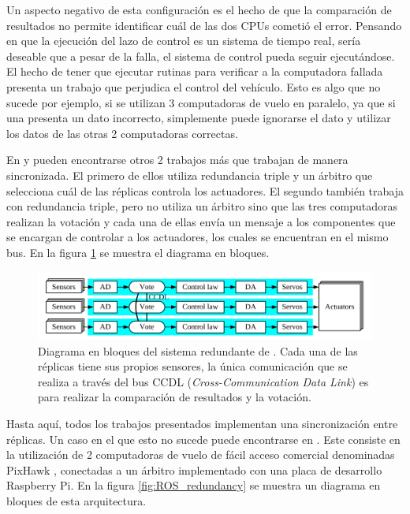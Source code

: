 Un aspecto negativo de esta configuración es el hecho de que la comparación de resultados no permite identificar cuál de las dos CPUs cometió el error. %
Pensando en que la ejecución del lazo de control es un sistema de tiempo real, sería deseable que a pesar de la falla, el sistema de control pueda seguir ejecutándose. El hecho de tener que ejecutar rutinas para verificar a la computadora fallada presenta un trabajo que perjudica el control del vehículo. Esto es algo que no sucede por ejemplo, si se utilizan 3 computadoras de vuelo en paralelo, ya que si una presenta un dato incorrecto, simplemente puede ignorarse el dato y utilizar los datos de las otras 2 computadoras correctas. %

En \cite{chen2015design} y \cite{wang2008development} pueden encontrarse otros 2 trabajos más que trabajan de manera sincronizada. El primero de ellos utiliza redundancia triple y un árbitro que selecciona cuál de las réplicas controla los actuadores. El segundo también trabaja con redundancia triple, pero no utiliza un árbitro sino que las tres computadoras realizan la votación y cada una de ellas envía un mensaje a los componentes que se encargan de controlar a los actuadores, los cuales se encuentran en el mismo bus. En la figura \ref{fig:RS_485_sync} se muestra el diagrama en bloques.

\begin{figure}[htb]
    \centering
    \includegraphics[width=\textwidth]{img/RS_485_sync.png}
    \caption{Diagrama en bloques del sistema redundante de \cite{wang2008development}. Cada una de las réplicas tiene sus propios sensores, la única comunicación que se realiza a través del bus CCDL (\textit{Cross-Communication Data Link}) es para realizar la comparación de resultados y la votación.}
    \label{fig:RS_485_sync}
\end{figure}

Hasta aquí, todos los trabajos presentados implementan una sincronización entre réplicas. Un caso en el que esto no sucede puede encontrarse en \cite{thesis_redundant_ROS}. Este consiste en la utilización de 2 computadoras de vuelo de fácil acceso comercial denominadas PixHawk \cite{dronecode-foundation-2023}, conectadas a un árbitro implementado con una placa de desarrollo Raspberry Pi. En la figura \ref{fig:ROS_redundancy} se muestra un diagrama en bloques de esta arquitectura.


